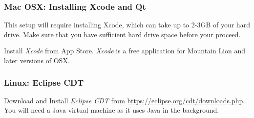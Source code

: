 \subsubsection{Mac OSX: Installing Xcode and Qt}
\label{sec:install-from-package}

This setup will require installing Xcode, which can
take up to 2-3GB of your hard drive. Make sure that you have
sufficient hard drive space before your proceed.

 Install \emph{Xcode} from App Store. \emph{Xcode} is a free
  application for Mountain Lion and later versions of OSX.
      


\subsubsection{Linux: Eclipse CDT}

 Download and Install \emph{Eclipse CDT} from \url{https://eclipse.org/cdt/downloads.php}. You will need a Java virtual machine as it uses Java in the background.

